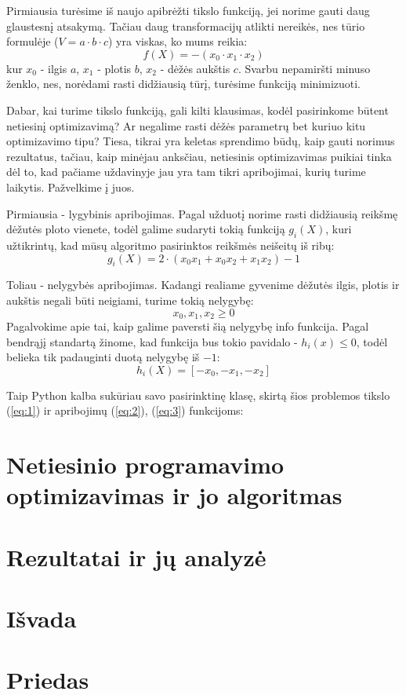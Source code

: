 \documentclass{article}
\begin{document}
Pirmiausia turėsime iš naujo apibrėžti tikslo funkciją, jei norime gauti daug glaustesnį atsakymą. Tačiau daug transformacijų atlikti nereikės, nes tūrio formulėje ($V = a\cdot b\cdot c$) yra viskas, ko mums reikia:
\begin{equation}\label{eq:1}
    f(X) = -(x_{0}\cdot x_{1}\cdot x_{2})
\end{equation}
kur $x_{0}$ - ilgis $a$, $x_{1}$ - plotis $b$, $x_{2}$ - dėžės aukštis $c$. Svarbu nepamiršti minuso ženklo, nes, norėdami rasti didžiausią tūrį, turėsime funkciją minimizuoti. 

Dabar, kai turime tikslo funkciją, gali kilti klausimas, kodėl pasirinkome būtent netiesinį optimizavimą? Ar negalime rasti dėžės parametrų bet kuriuo kitu optimizavimo tipu? Tiesa, tikrai yra keletas sprendimo būdų, kaip gauti norimus rezultatus, tačiau, kaip minėjau anksčiau, netiesinis optimizavimas puikiai tinka dėl to, kad pačiame uždavinyje jau yra tam tikri apribojimai, kurių turime laikytis. Pažvelkime į juos.

Pirmiausia - lygybinis apribojimas. Pagal užduotį norime rasti didžiausią reikšmę dėžutės ploto vienete, todėl galime sudaryti tokią funkciją $g_{i}(X)$, kuri užtikrintų, kad mūsų algoritmo pasirinktos reikšmės neišeitų iš ribų:
\begin{equation}\label{eq:2}
    g_{i}(X) = 2\cdot(x_{0}x_{1}+x_{0}x_{2}+x_{1}x_{2}) - 1
\end{equation}

Toliau - nelygybės apribojimas. Kadangi realiame gyvenime dėžutės ilgis, plotis ir aukštis negali būti neigiami, turime tokią nelygybę:
\begin{equation*}
    x_{0},x_{1},x_{2}\geq 0
\end{equation*}
Pagalvokime apie tai, kaip galime paversti šią nelygybę info funkcija. Pagal bendrąjį standartą žinome, kad funkcija bus tokio pavidalo - $h_i(x)\leq 0$, todėl belieka tik padauginti duotą nelygybę iš $-1$:
\begin{equation}\label{eq:3}
    h_{i}(X) = [-x_{0}, -x_{1}, -x_{2}]
\end{equation}

Taip Python kalba sukūriau savo pasirinktinę klasę, skirtą šios problemos tikslo (\ref{eq:1}) ir apribojimų (\ref{eq:2}), (\ref{eq:3}) funkcijoms:
\section{Netiesinio programavimo optimizavimas ir jo algoritmas}
\section{Rezultatai ir jų analyzė}
\section{Išvada}
\section{Priedas}
\end{document}
